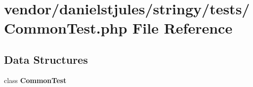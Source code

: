 \section{vendor/danielstjules/stringy/tests/\+Common\+Test.php File Reference}
\label{_common_test_8php}
\subsection*{Data Structures}
\begin{DoxyCompactItemize}
\item 
class {\bf Common\+Test}
\end{DoxyCompactItemize}
